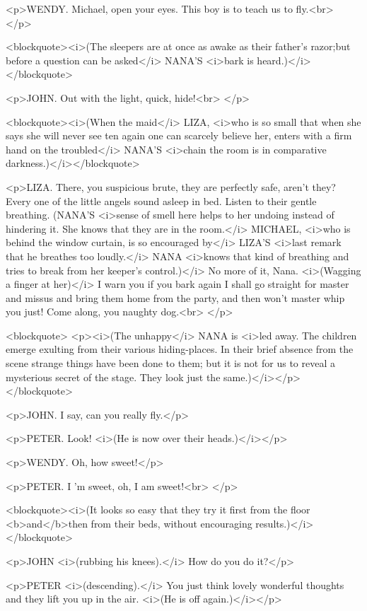 <p>WENDY. Michael, open your eyes. This boy is to teach us to
fly.<br>
</p>

<blockquote><i>(The sleepers are at once as awake as their father's
razor;but before a question can be asked</i> NANA'S <i>bark is
heard.)</i></blockquote>

<p>JOHN. Out with the light, quick, hide!<br>
</p>

<blockquote><i>(When the maid</i> LIZA, <i>who is so small that when
she says she will never see ten again one can scarcely believe her,
enters with a firm hand on the troubled</i> NANA'S <i>chain the room
is in comparative darkness.)</i></blockquote>

<p>LIZA. There, you suspicious brute, they are perfectly safe, aren't
they? Every one of the little angels sound asleep in bed. Listen to
their gentle breathing. (NANA'S <i>sense of smell here helps to her
undoing instead of hindering it. She knows that they are in the
room.</i> MICHAEL, <i>who is behind the window curtain, is so
encouraged by</i> LIZA'S <i>last remark that he breathes too
loudly.</i> NANA <i>knows that kind of breathing and tries to break
from her keeper's control.)</i> No more of it, Nana. <i>(Wagging a
finger at her)</i> I warn you if you bark again I shall go straight
for master and missus and bring them home from the party, and then
won't master whip you just! Come along, you naughty dog.<br>
</p>

<blockquote>
<p><i>(The unhappy</i> NANA is <i>led away. The children emerge
exulting from their various hiding-places. In their brief absence
from the scene strange things have been done to them; but it is not
for us to reveal a mysterious secret of the stage. They look just the
same.)</i></p>
</blockquote>

<p>JOHN. I say, can you really fly.</p>

<p>PETER. Look! <i>(He is now over their heads.)</i></p>

<p>WENDY. Oh, how sweet!</p>

<p>PETER. I 'm sweet, oh, I am sweet!<br>
</p>

<blockquote><i>(It looks so easy that they try it first from the
floor <b>and</b>then from their beds, without encouraging
results.)</i></blockquote>

<p>JOHN <i>(rubbing his knees).</i> How do you do it?</p>

<p>PETER <i>(descending).</i> You just think lovely wonderful
thoughts and they lift you up in the air. <i>(He is off
again.)</i></p>

